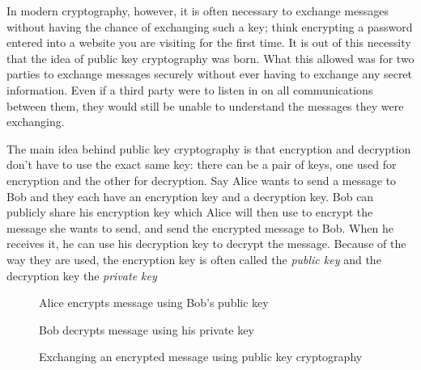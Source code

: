 \documentclass[12pt, titlepage]{article}
\begin{document}
    In modern cryptography, however, it is often necessary to exchange messages without
    having the chance of exchanging such a key; think encrypting a password entered into a
    website you are visiting for the first time. It is out of this necessity that the idea
    of public key cryptography was born. What this allowed was for two parties to exchange
    messages securely without ever having to exchange any secret information. Even if a
    third party were to listen in on all communications between them, they would still be
    unable to understand the messages they were exchanging.

    The main idea behind public key cryptography is that encryption and decryption don't
    have to use the exact same key: there can be a pair of keys, one used for encryption and
    the other for decryption. Say Alice wants to send a message to Bob and they each have an
    encryption key and a decryption key. Bob can publicly share his encryption key which
    Alice will then use to encrypt the message she wants to send, and send the encrypted
    message to Bob. When he receives it, he can use his decryption key to decrypt the
    message. Because of the way they are used, the encryption key is often called the
    \emph{public key} and the decryption key the \emph{private key}

    \begin{figure}[h!] 
    \centering
        \label{fig:message_exchange}
        
        \vspace{1cm}
        Alice encrypts message using Bob's public key
        \vspace{1cm}


        \vspace{1cm}
        Bob decrypts message using his private key
        \vspace{1cm}

        \caption{Exchanging an encrypted message using public key cryptography}
    \end{figure}
\end{document}
